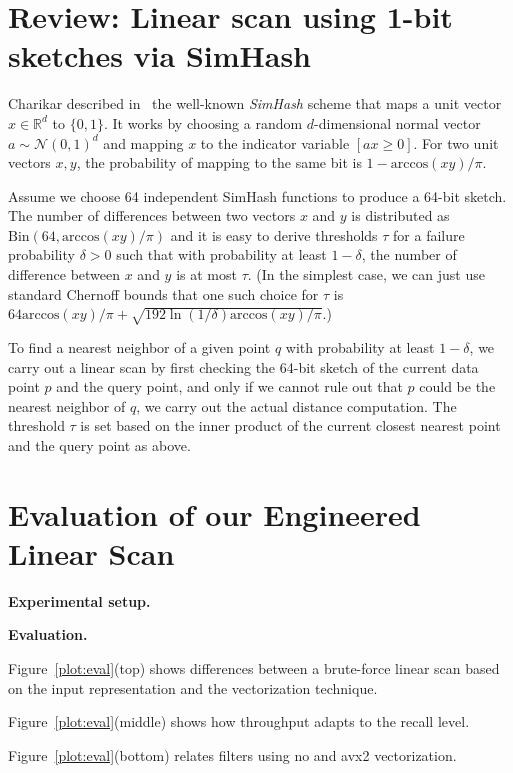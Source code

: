 \documentclass{llncs}
\newcommand{\myparagraph}[1]{\noindent \textbf{#1}}
\begin{document}
\section{Review: Linear scan using 1-bit sketches via SimHash}
\label{app:sketches}

Charikar described in~\cite{Charikar02} the well-known \emph{SimHash} scheme that maps a unit vector $x \in \mathbb{R}^d$ to $\{0,1\}$. 
It works by choosing a random $d$-dimensional normal vector $a \sim \mathcal{N}(0, 1)^d$   and mapping $x$ to the indicator variable $[ax \geq 0]$. For two unit vectors $x,y$, the probability of mapping to the same bit is $1 - \text{arccos}(xy)/\pi$.

Assume we choose 64 independent SimHash functions to produce a 64-bit sketch. The number of differences between two vectors $x$ and $y$ is distributed as $\text{Bin}(64,\text{arccos}(xy)/\pi )$ and it is easy to derive thresholds $\tau$ for a failure probability $\delta > 0$ such that with probability at least $1-\delta$, the number of difference between $x$ and $y$ is at most $\tau$. (In the simplest case, we can just use standard Chernoff bounds that one such choice for $\tau$ is $64\text{arccos}(xy)/\pi  + \sqrt{192 \ln (1/\delta)\text{arccos}(xy)/\pi}$.)

To find a nearest neighbor of a given point $q$ with probability at least $1-\delta$, we carry out a linear scan by first checking the 64-bit sketch of the current data point $p$ and the query point, and only if we cannot rule out that $p$ could be the nearest neighbor of $q$, we carry out the actual distance computation. The threshold $\tau$ is set based on the inner product of the current closest nearest point and the query point as above.


\section{Evaluation of our Engineered Linear Scan}
\label{app:linear:scan}

\myparagraph{Experimental setup.}

\myparagraph{Evaluation.}

Figure~\ref{plot:eval}(top) shows differences between a brute-force linear scan based on the input representation and the vectorization technique. 

Figure~\ref{plot:eval}(middle) shows how throughput adapts to the recall level. 

Figure~\ref{plot:eval}(bottom) relates filters using no and avx2 vectorization.
\end{document}
